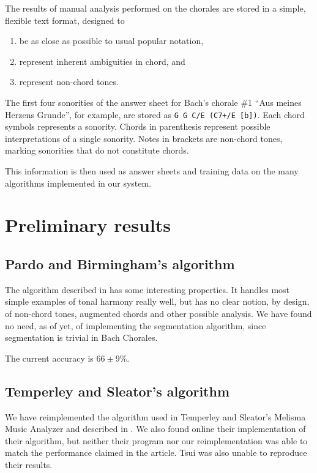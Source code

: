 \documentclass{article}
\begin{document}
The results of manual analysis performed on the chorales are stored in
a simple, flexible text format, designed to

\begin{enumerate}
\item be as close as possible to usual popular notation,
\item represent inherent ambiguities in chord, and
\item represent non-chord tones.
\end{enumerate}

The first four sonorities of the answer sheet for Bach's chorale \#1
``Aus meines Herzens Grunde'', for example, are stored as \texttt{G G
  C/E (C7+/E [b])}. Each chord symbols represents a sonority. Chords
in parenthesis represent possible interpretations of a single
sonority. Notes in brackets are non-chord tones, marking sonorities
that do not constitute chords.

This information is then used as answer sheets and training data on the
many algorithms implemented in our system.

\section{Preliminary results}
\label{sec:analysis-results}

\subsection{Pardo and Birmingham's algorithm}
\label{sec:pardo-birmingham}

The algorithm described in \cite{pardo.ea:automated} has some
interesting properties. It handles most simple examples of tonal
harmony really well, but has no clear notion, by design, of non-chord
tones, augmented chords and other possible analysis. We
have found no need, as of yet, of implementing the segmentation
algorithm, since segmentation is trivial in Bach Chorales.

The current accuracy is $66 \pm 9\%$.

\subsection{Temperley and Sleator's algorithm}
\label{sec:temperley}

We have reimplemented the algorithm used in Temperley and Sleator's
Melisma Music Analyzer and described in
\cite{temperley.ea:modeling}. We also found online their
implementation of their algorithm, but neither their program nor our
reimplementation was able to match the performance claimed in the
article. Tsui \cite{tsui:harmonic} was also unable to reproduce their
results.
\end{document}
